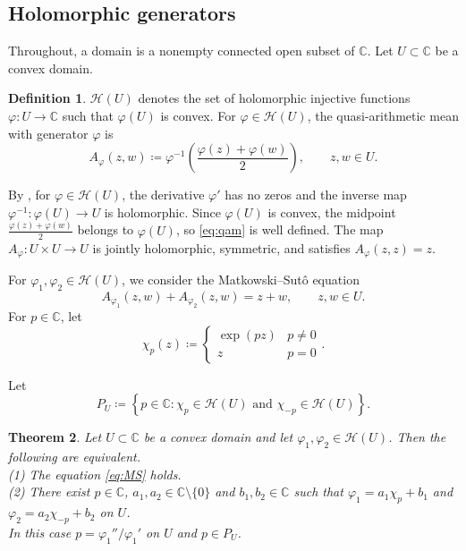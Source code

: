 \documentclass[a4paper, reqno, 11pt]{amsart}
\newtheorem{Thm}{Theorem}[section]
\theoremstyle{definition}
\newtheorem{Def}[Thm]{Definition}
\begin{document}
\subsection{Holomorphic generators}\label{subsec:holo}

Throughout, a domain is a nonempty connected open subset of $\mathbb{C}$.
Let $U \subset \mathbb{C}$ be a convex domain.

\begin{Def}\label{def:H}
$\mathcal{H}(U)$ denotes the set of holomorphic injective functions $\varphi \colon U \to \mathbb{C}$ such that $\varphi(U)$ is convex.
For $\varphi \in \mathcal{H}(U)$, the quasi-arithmetic mean with generator $\varphi$ is
\begin{equation}\label{eq:qam}
A_{\varphi}(z,w) \coloneqq  \varphi^{-1}\left(\frac{\varphi(z)+\varphi(w)}{2}\right), \qquad z, w \in U .
\end{equation}
\end{Def}

By \cite[Theorem 10.33]{Rudin1987}, for $\varphi \in \mathcal{H}(U)$, the derivative $\varphi'$ has no zeros and the inverse map $\varphi^{-1} \colon \varphi(U) \to U$ is holomorphic.
Since $\varphi(U)$ is convex, the midpoint $\frac{\varphi(z)+\varphi(w)}{2}$ belongs to $\varphi(U)$, so \eqref{eq:qam} is well defined.
The map $A_{\varphi} \colon U \times U \to U$ is jointly holomorphic, symmetric, and satisfies $A_{\varphi}(z,z) = z$.

For $\varphi_1, \varphi_2 \in \mathcal{H}(U)$, we consider the Matkowski--Sut\^o equation
\begin{equation}\label{eq:MS}
A_{\varphi_1}(z,w) + A_{\varphi_2}(z,w) = z + w, \qquad z, w \in U .
\end{equation}
For $p \in \mathbb{C}$, let 
\begin{equation}\label{eq:chi}
\chi_p (z) \coloneqq \begin{cases} \exp(pz)  & p \ne 0\\ z & p = 0\end{cases}.
\end{equation}

Let 
\[ P_U \coloneqq  \left\{ p \in \mathbb{C} : \chi_p \in \mathcal{H}(U) \text{ and } \chi_{-p} \in \mathcal{H}(U) \right\}.\] 


\begin{Thm}\label{thm:main}
Let $U \subset \mathbb{C}$ be a convex domain and let $\varphi_1, \varphi_2 \in \mathcal{H}(U)$.
Then the following are equivalent. \\
(1) The equation \eqref{eq:MS} holds. \\
(2) There exist $p \in \mathbb{C}$, $a_1, a_2 \in \mathbb{C} \setminus \{0\}$ and $b_1, b_2 \in \mathbb{C}$ such that $\varphi_1 = a_1 \chi_p + b_1$ and $\varphi_2 = a_2 \chi_{-p} + b_2$ on $U$. \\
In this case $p = \varphi_1''/\varphi_1'$ on $U$ and $p \in P_U$.
\end{Thm}
\end{document}
